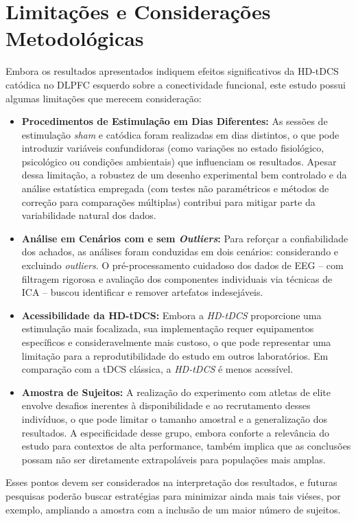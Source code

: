 \section{Limitações e Considerações Metodológicas}
\label{sec:limitacoes}
Embora os resultados apresentados indiquem efeitos significativos da HD-tDCS catódica no DLPFC esquerdo sobre a conectividade funcional, este estudo possui algumas limitações que merecem consideração:

\begin{itemize}
    \item \textbf{Procedimentos de Estimulação em Dias Diferentes:} As sessões de estimulação \emph{sham} e catódica foram realizadas em dias distintos, o que pode introduzir variáveis confundidoras (como variações no estado fisiológico, psicológico ou condições ambientais) que influenciam os resultados. Apesar dessa limitação, a robustez de um desenho experimental bem controlado e da análise estatística empregada (com testes não paramétricos e métodos de correção para comparações múltiplas) contribui para mitigar parte da variabilidade natural dos dados.
    
    \item \textbf{Análise em Cenários com e sem \textit{Outliers}:} Para reforçar a confiabilidade dos achados, as análises foram conduzidas em dois cenários: considerando e excluindo \textit{outliers}. O pré-processamento cuidadoso dos dados de EEG – com filtragem rigorosa e avaliação dos componentes individuais via técnicas de ICA – buscou identificar e remover artefatos indesejáveis.
    
    \item \textbf{Acessibilidade da HD-tDCS:} Embora a \emph{HD-tDCS} proporcione uma estimulação mais focalizada, sua implementação requer equipamentos específicos e consideravelmente mais custoso, o que pode representar uma limitação para a reprodutibilidade do estudo em outros laboratórios. Em comparação com a tDCS clássica, a \emph{HD-tDCS} é menos acessível.
    
    \item \textbf{Amostra de Sujeitos:} A realização do experimento com atletas de elite envolve desafios inerentes à disponibilidade e ao recrutamento desses indivíduos, o que pode limitar o tamanho amostral e a generalização dos resultados. A especificidade desse grupo, embora conforte a relevância do estudo para contextos de alta performance, também implica que as conclusões possam não ser diretamente extrapoláveis para populações mais amplas.
\end{itemize}

Esses pontos devem ser considerados na interpretação dos resultados, e futuras pesquisas poderão buscar estratégias para minimizar ainda mais tais viéses, por exemplo, ampliando a amostra com a inclusão de um maior número de sujeitos.